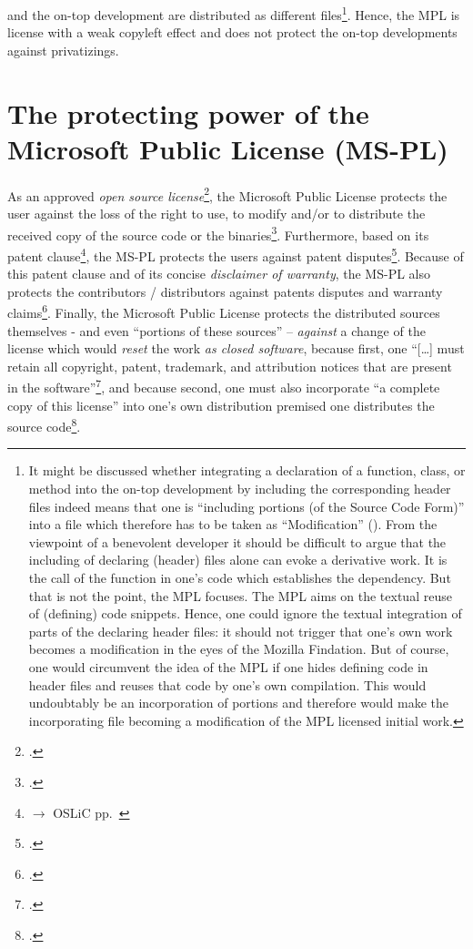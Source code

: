 and the on-top development are distributed as different files\footnote{It might
be discussed whether integrating a declaration of a function, class, or method
into the on-top development by including the corresponding header files indeed
means that one is \enquote{including portions (of the Source Code Form)} into a
file which therefore has to be taken as \enquote{Modification}
(\cite[cf.][\nopage wp\ §1.4]{Mpl11MozFoundation2013a}). From the viewpoint of
a benevolent developer it should be difficult to argue that the including of
declaring (header) files alone can evoke a derivative work. It is the call of
the function in one's code which establishes the dependency. But that is not the
point, the MPL focuses. The MPL aims on the textual reuse of (defining) code
snippets. Hence, one could ignore the textual integration of parts of the
declaring header files: it should not trigger that one's own work becomes a
modification in the eyes of the Mozilla Findation. But of course, one would
circumvent the idea of the MPL if one hides defining code in header files and
reuses that code by one's own compilation. This would undoubtably be an
incorporation of portions and therefore would make the incorporating file
becoming a modification of the MPL licensed initial work. }. Hence, the MPL is
license with a weak copyleft effect and does not protect the on-top developments
against privatizings.

\section{The protecting power of the Microsoft Public License (MS-PL)}
\label{sec:ProtectingPowerOfMspl}

As an approved \emph{open source license}\footcite[cf.][\nopage wp]{OSI2012b},
the Microsoft Public License protects the user against the loss of the right to
use, to modify and/or to distribute the received copy of the source code or the
binaries\footcite[cf.][\nopage wp
§2]{MsplOsiLicense2013a}. Furthermore, based on its patent
clause\footnote{$\rightarrow$ OSLiC pp.\ \pageref{subsec:MsplPatentClause}}, the
MS-PL protects the users against patent disputes\footcite[cf.][\nopage wp
§2.B and §3.B]{MsplOsiLicense2013a}. Because of this patent clause and of its
concise \emph{disclaimer of warranty}, the MS-PL also protects the contributors
/ distributors against patents disputes and warranty
claims\footcite[cf.][\nopage wp §2B, §3B, §3D]{MsplOsiLicense2013a}.
Finally, the Microsoft Public License protects the distributed sources
themselves - and even \enquote{portions of these sources} -- \emph{against} a
change of the license which would \emph{reset} the work \emph{as closed
software}, because first, one \enquote{[\ldots] must retain all copyright,
patent, trademark, and attribution notices that are present in the
software}\footcite[cf.][\nopage wp §3C]{MsplOsiLicense2013a}, and because
second, one must also incorporate \enquote{a complete copy of this license} into
one's own distribution premised one distributes the source
code\footcite[cf.][\nopage wp §3D]{MsplOsiLicense2013a}.

